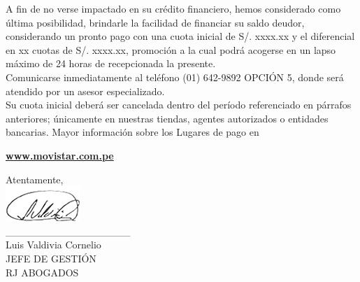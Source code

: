 \noindent A fin de no verse impactado en su crédito financiero, hemos considerado como última posibilidad, brindarle la facilidad de financiar su saldo deudor, considerando un pronto pago con una cuota inicial de S/. xxxx.xx   y el diferencial en xx  cuotas de S/. xxxx.xx, promoción a la cual podrá acogerse en un lapso máximo de 24 horas de recepcionada la presente.\\

\noindent Comunicarse inmediatamente al teléfono (01) 642-9892 OPCIÓN 5, donde será atendido por un asesor especializado.\\
\noindent Su cuota inicial deberá ser cancelada dentro del período referenciado en párrafos anteriores; únicamente en nuestras tiendas, agentes autorizados o entidades bancarias. Mayor información sobre los Lugares de pago en
\begin{center}
\underline{\textcolor[rgb]{0.00,0.07,1.00}{\textbf{www.movistar.com.pe}}}
\end{center}

\noindent Atentamente,\\
\includegraphics[natwidth=2.831041667cm, natheight=1.322916667cm]{resources/lawyer_signature.png}\\
\_\_\_\_\_\_\_\_\_\_\_\_\_\_\_\_\_\\
{\small Luis Valdivia Cornelio\\
JEFE DE GESTIÓN\\
RJ ABOGADOS}\\


